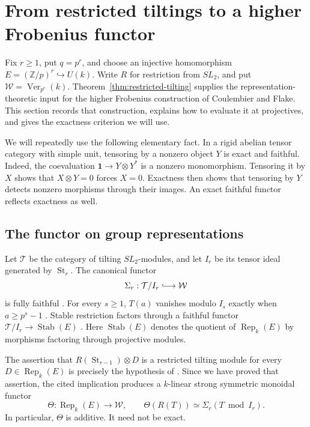 \section{From restricted tiltings to a higher Frobenius functor}
\label{sec:higher}

Fix $r\geq1$, put $q=p^r$, and choose an injective homomorphism
$E=(\mathbb Z/p)^r\hookrightarrow U(k)$.  Write $R$ for restriction
from $SL_2$, and put $\mathcal W=\operatorname{Ver}_{p^r}(k)$.
Theorem~\ref{thm:restricted-tilting} supplies the
representation-theoretic input for the higher Frobenius construction of
Coulembier and Flake.  This section records that construction, explains
how to evaluate it at projectives, and gives the exactness criterion we
will use.

We will repeatedly use the following elementary fact.  In a rigid
abelian tensor category with simple unit, tensoring by a nonzero
object $Y$ is exact and faithful.  Indeed, the coevaluation
$\mathbf1\to Y\otimes Y^*$ is a nonzero monomorphism.  Tensoring
it by $X$ shows that $X\otimes Y=0$ forces $X=0$.  Exactness then
shows that tensoring by $Y$ detects nonzero morphisms through their
images.  An exact faithful functor reflects exactness as well.

\subsection{The functor on group representations}

Let $\mathcal T$ be the category of tilting $SL_2$-modules, and let
$I_r$ be its tensor ideal generated by $\operatorname{St}_r$.
The canonical functor
\[
 \Sigma_r:\mathcal T/I_r\lhook\joinrel\longrightarrow\mathcal W
\]
is fully faithful \cite[Theorem~4.2(i)]{BEO2023}.
For every $s\geq1$, $T(a)$ vanishes modulo $I_s$ exactly when
$a\geq p^s-1$ \cite[Section~3.1]{BEO2023}.
Stable restriction factors through a faithful
functor $\mathcal T/I_r\to\operatorname{Stab}(E)$
\cite[Theorem~5.3.5]{CoulembierFlakeHigher}.
Here $\operatorname{Stab}(E)$ denotes the quotient of
$\operatorname{Rep}_k(E)$ by morphisms factoring through projective
modules.

The assertion that
$R(\operatorname{St}_{r-1})\otimes D$ is a restricted tilting module
for every $D\in\operatorname{Rep}_k(E)$ is precisely the hypothesis
of \cite[Conjecture~5.4.2(1), Theorem~5.4.3]{CoulembierFlakeHigher}.
Since we have proved that assertion, the cited implication produces a
$k$-linear strong symmetric monoidal functor
\begin{equation}\label{eq:theta}
 \Theta:\operatorname{Rep}_k(E)\longrightarrow\mathcal W,
 \qquad \Theta(R(T))\simeq\Sigma_r(T\bmod I_r).
\end{equation}
In particular, $\Theta$ is additive.  It need not be exact.

